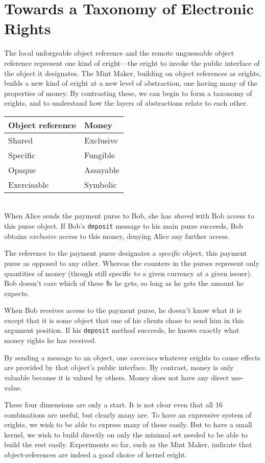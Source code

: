 \documentclass{llncs}
\begin{document}
\section{Towards a Taxonomy of Electronic Rights}

The local unforgeable object reference and the remote unguessable object reference represent one kind of eright---the eright to invoke the public interface of the object it designates. The Mint Maker, building on object references as erights, builds a new kind of eright at a new level of abstraction, one having many of the properties of money. By contrasting these, we can begin to form a taxonomy of erights, and to understand how the layers of abstractions relate to each other. 

\begin{tabular}{ l l }
  Object reference & Money \\ \hline
  Shared & Exclusive \\
  Specific & Fungible \\
  Opaque & Assayable \\
  Exercisable & Symbolic \\
\end{tabular}\\

When Alice sends the payment purse to Bob, she has \emph{shared} with Bob access to this purse object. If Bob's {\tt deposit} message to his main purse succeeds, Bob obtains \emph{exclusive} access to this money, denying Alice any further access.

The reference to the payment purse designates a \emph{specific} object, this payment purse as opposed to any other. Whereas the counters in the purses represent only quantities of money (though still specific to a given currency at a given issuer). Bob doesn't care which of these \$s he gets, so long as he gets the amount he expects.

When Bob receives access to the payment purse, he doesn't know what it is except that it is some object that one of his clients chose to send him in this argument position. If his {\tt deposit} method succeeds, he knows exactly what money rights he has received.

By sending a message to an object, one \emph{exercises} whatever erights to cause effects are provided by that object's public interface. By contrast, money is only valuable because it is valued by others. Money does not have any direct use-value.

These four dimensions are only a start. It is not clear even that all 16 combinations are useful, but clearly many are. To have an expressive system of erights, we wish to be able to express many of these easily. But to have a small kernel, we wish to build directly on only the minimal set needed to be able to build the rest easily. Experiments so far, such as the Mint Maker, indicate that object-references are indeed a good choice of kernel eright.
\end{document}
